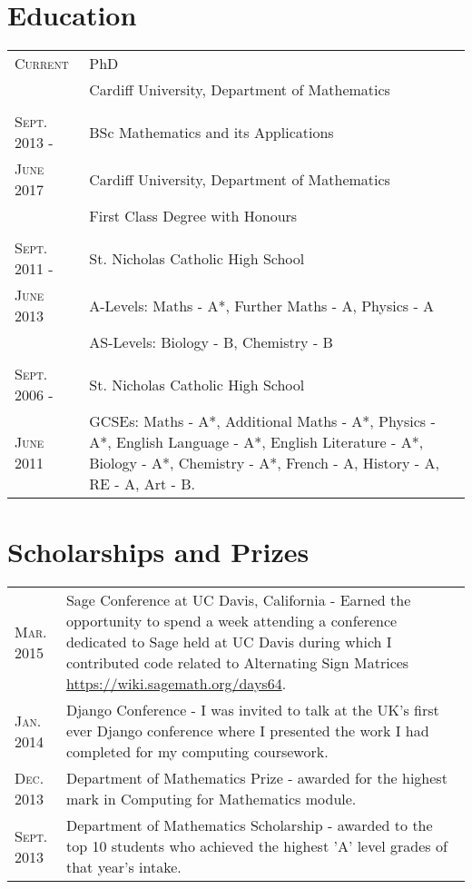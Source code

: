\documentclass[a4paper]{article}
\begin{document}
\section{Education}
\begin{tabularx}{\textwidth}{lX}
\textsc{Current} & \textsc PhD \\
&\normalsize Cardiff University, Department of Mathematics\\
\\
\textsc{Sept. 2013 - } & \textsc BSc Mathematics and its Applications \\
\textsc{June 2017} &\normalsize Cardiff University, Department of Mathematics\\
& First Class Degree with Honours\\
\\
\textsc{Sept. 2011 -} & St. Nicholas Catholic High School\\
\textsc{June 2013} & A-Levels: Maths - A*, Further Maths - A, Physics - A\\
& AS-Levels: Biology - B, Chemistry - B\\
\\
\textsc{Sept. 2006 -} & St. Nicholas Catholic High School\\
\textsc{June 2011} & GCSEs: Maths - A*, Additional Maths - A*, Physics - A*, English Language - A*, English Literature - A*, Biology - A*, Chemistry - A*, French - A, History - A, RE - A, Art - B.\\
\end{tabularx}

\section{Scholarships and Prizes}
\begin{tabularx}{\textwidth}{lX}
\textsc{Mar.} 2015 & Sage Conference at UC Davis, California - Earned the opportunity to spend a week attending a conference dedicated to Sage held at UC Davis during which I contributed code related to Alternating Sign Matrices \url{https://wiki.sagemath.org/days64}.\\
\textsc{Jan.} 2014 & Django Conference - I was invited to talk at the UK's first ever Django conference where I presented the work I had completed for my computing coursework.\\
\textsc{Dec.} 2013 & Department of Mathematics Prize - awarded for the highest mark in Computing for Mathematics module.\\
\textsc{Sept.} 2013 & Department of Mathematics Scholarship - awarded to the top 10 students who achieved the highest 'A' level grades of that year's intake.\\
\end{tabularx}
\end{document}
